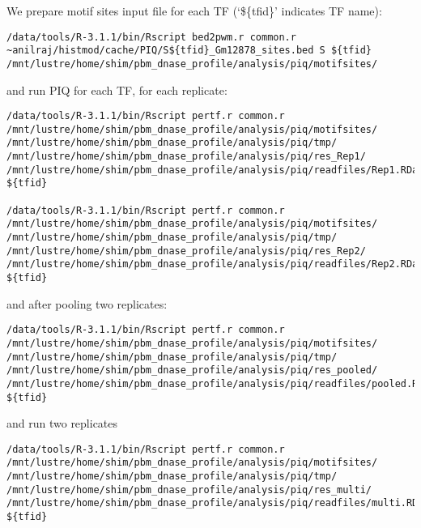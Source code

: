 \documentclass[11pt]{article}
\begin{document}
We prepare motif sites input file for each TF (`\$\{tfid\}' indicates TF name): 
\begin{lstlisting}
/data/tools/R-3.1.1/bin/Rscript bed2pwm.r common.r ~anilraj/histmod/cache/PIQ/S${tfid}_Gm12878_sites.bed S ${tfid} /mnt/lustre/home/shim/pbm_dnase_profile/analysis/piq/motifsites/
\end{lstlisting}
and run PIQ for each TF, for each replicate: 
\begin{lstlisting}
/data/tools/R-3.1.1/bin/Rscript pertf.r common.r /mnt/lustre/home/shim/pbm_dnase_profile/analysis/piq/motifsites/ /mnt/lustre/home/shim/pbm_dnase_profile/analysis/piq/tmp/ /mnt/lustre/home/shim/pbm_dnase_profile/analysis/piq/res_Rep1/ /mnt/lustre/home/shim/pbm_dnase_profile/analysis/piq/readfiles/Rep1.RData ${tfid}

/data/tools/R-3.1.1/bin/Rscript pertf.r common.r /mnt/lustre/home/shim/pbm_dnase_profile/analysis/piq/motifsites/ /mnt/lustre/home/shim/pbm_dnase_profile/analysis/piq/tmp/ /mnt/lustre/home/shim/pbm_dnase_profile/analysis/piq/res_Rep2/ /mnt/lustre/home/shim/pbm_dnase_profile/analysis/piq/readfiles/Rep2.RData ${tfid}
\end{lstlisting}
and after pooling two replicates:
\begin{lstlisting}
/data/tools/R-3.1.1/bin/Rscript pertf.r common.r /mnt/lustre/home/shim/pbm_dnase_profile/analysis/piq/motifsites/ /mnt/lustre/home/shim/pbm_dnase_profile/analysis/piq/tmp/ /mnt/lustre/home/shim/pbm_dnase_profile/analysis/piq/res_pooled/ /mnt/lustre/home/shim/pbm_dnase_profile/analysis/piq/readfiles/pooled.RData ${tfid}
\end{lstlisting}
and run two replicates
\begin{lstlisting}
/data/tools/R-3.1.1/bin/Rscript pertf.r common.r /mnt/lustre/home/shim/pbm_dnase_profile/analysis/piq/motifsites/ /mnt/lustre/home/shim/pbm_dnase_profile/analysis/piq/tmp/ /mnt/lustre/home/shim/pbm_dnase_profile/analysis/piq/res_multi/ /mnt/lustre/home/shim/pbm_dnase_profile/analysis/piq/readfiles/multi.RData ${tfid}
\end{lstlisting}
\end{document}
